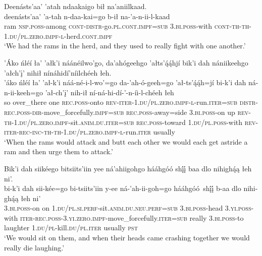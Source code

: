 \ea\label{ex:text6-6-2}
Deenásts’aa’ ’atah ndaakaigo bił na’aniilkaad.\\
\gll deenásts’aa’	’a-tah	n-daa-kai=go	b-ił	na-’a-n-ii-l-kaad\\
     ram	\textsc{nsp}.\textsc{poss}-among	\textsc{cont}-\textsc{distr}-go.\textsc{pl}.\textsc{cont}.\textsc{impf}=\textsc{sub}	3.\textsc{bi}.\textsc{poss}-with	\textsc{cont}-\textsc{th}-\textsc{th}-1.\textsc{du}/\textsc{pl}.\textsc{zero}.\textsc{impf}-\textsc{l}-herd.\textsc{cont}.\textsc{impf}\\
\glt `We had the rams in the herd, and they used to really fight with one another.'
\z

\ea\label{ex:text6-6-3}
’Áko ńléí ła’ ’ałk’i náánéilwo’go, da’ahógeehgo ’ałts’ą́ą́hjí bik’i dah nániikeehgo ’ałch’į’ nihił nínáhidí’níilchéeh łeh.\\
\gll ’áko	ńléí	ła’	’ał-k’i	náá-né-i-l-wo’=go	da-’ah-ó-geeh=go	’ał-ts’ą́ą́h=jí	bi-k’i	dah	ná-n-ii-keeh=go	’ał-ch’į’	nih-ił	ní-ná-hi-dí-’-n-íi-l-chéeh	łeh\\
     so	over\_there	one	\textsc{rec}.\textsc{poss}-onto	\textsc{rev}-\textsc{iter}-1.\textsc{du}/\textsc{pl}.\textsc{zero}.\textsc{impf}-\textsc{l}-run.\textsc{iter}=\textsc{sub}	\textsc{distr}-\textsc{rec}.\textsc{poss}-\textsc{dir}-move\_forcefully.\textsc{impf}=\textsc{sub}	\textsc{rec}.\textsc{poss}-away=side	3.\textsc{bi}.\textsc{poss}-on	up	\textsc{rev}-\textsc{th}-1.\textsc{du}/\textsc{pl}.\textsc{zero}.\textsc{impf}-sit.\textsc{anim}.\textsc{du}.\textsc{iter}=\textsc{sub}	\textsc{rec}.\textsc{poss}-toward	1.\textsc{du}/\textsc{pl}.\textsc{poss}-with	\textsc{rev}-\textsc{iter}-\textsc{rec}-\textsc{inc}-\textsc{th}-\textsc{th}-1.\textsc{du}/\textsc{pl}.\textsc{zero}.\textsc{impf}-\textsc{l}-run.\textsc{iter}	usually\\
\glt `When the rams would attack and butt each other we would each get astride a ram and then urge them to attack.'
\z

\ea\label{ex:text6-6-4}
Bik’i dah siikéego bitsiits’iin yee ná’ahiigohgo hááhgóó shį́į́ baa dlo nihighą́ą łeh ni’.\\
\gll bi-k’i	dah	sii-kée=go	bi-tsiits’iin	y-ee	ná-’ah-ii-goh=go	hááhgóó~{shį́į́}	b-aa	dlo	nihi-ghą́ą	łeh	ni’\\
     3.\textsc{bi}.\textsc{poss}-on	on	1.\textsc{du}/\textsc{pl}.\textsc{si}.\textsc{perf}-sit.\textsc{anim}.\textsc{du}.\textsc{neu}.\textsc{perf}=\textsc{sub}	3.\textsc{bi}.\textsc{poss}-head	3.\textsc{yi}.\textsc{poss}-with	\textsc{iter}-\textsc{rec}.\textsc{poss}-3.\textsc{yi}.\textsc{zero}.\textsc{impf}-move\_forcefully.\textsc{iter}=\textsc{sub}	really	3.\textsc{bi}.\textsc{poss}-to	laughter	1.\textsc{du}/\textsc{pl}-kill.\textsc{du}/\textsc{pl}.\textsc{iter}	usually	\textsc{pst}\\
\glt `We would sit on them, and when their heads came crashing together we would really die laughing.'
\z

